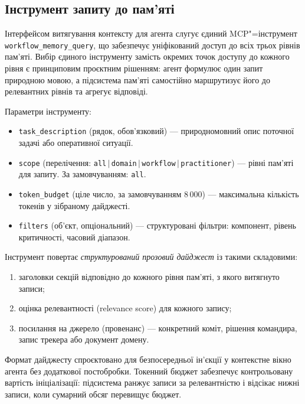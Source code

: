 \documentclass[11pt]{article}
\begin{document}
\subsection{Інструмент запиту до пам'яті}
\label{sec:memory-query-tool}

Інтерфейсом витягування контексту для агента слугує єдиний MCP"=інструмент \texttt{workflow\_memory\_query}, що забезпечує уніфікований доступ до всіх трьох рівнів пам'яті.
Вибір єдиного інструменту замість окремих точок доступу до кожного рівня є принциповим проєктним рішенням: агент формулює один запит природною мовою, а підсистема пам'яті самостійно маршрутизує його до релевантних рівнів та агрегує відповіді.

Параметри інструменту:
\begin{itemize}[leftmargin=*, nosep]
  \item \texttt{task\_description} (рядок, обов'язковий) --- природномовний опис поточної задачі або оперативної ситуації.
  \item \texttt{scope} (перелічення: \texttt{all}\,$|$\,\texttt{domain}\,$|$\,\texttt{workflow}\,$|$\,\texttt{practitioner}) --- рівні пам'яті для запиту. За замовчуванням: \texttt{all}.
  \item \texttt{token\_budget} (ціле число, за замовчуванням 8\,000) --- максимальна кількість токенів у зібраному дайджесті.
  \item \texttt{filters} (об'єкт, опціональний) --- структуровані фільтри: компонент, рівень критичності, часовий діапазон.
\end{itemize}

Інструмент повертає \emph{структурований прозовий дайджест} із такими складовими:
\begin{enumerate}[nosep]
  \item заголовки секцій відповідно до кожного рівня пам'яті, з якого витягнуто записи;
  \item оцінка релевантності (relevance score) для кожного запису;
  \item посилання на джерело (провенанс) --- конкретний коміт, рішення командира, запис трекера або документ домену.
\end{enumerate}

Формат дайджесту спроєктовано для безпосередньої ін'єкції у контекстне вікно агента без додаткової постобробки.
Токенний бюджет забезпечує контрольовану вартість ініціалізації: підсистема ранжує записи за релевантністю і відсікає нижні записи, коли сумарний обсяг перевищує бюджет.
\end{document}
